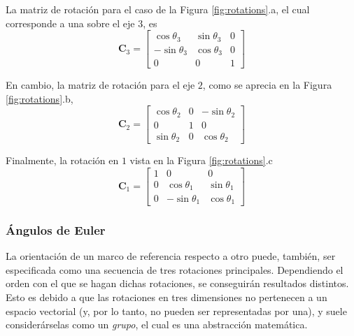 La matriz de rotación para el caso de la Figura \ref{fig:rotations}.a, el cual corresponde a una sobre el eje $3$, es
\begin{equation}
    \bm{C}_3 = 
    \begin{bmatrix}
        \cos \theta_3 & \sin \theta_3 & 0 \\
        -\sin \theta_3 & \cos \theta_3 & 0 \\
        0 & 0 & 1
    \end{bmatrix}
\end{equation}

En cambio, la matriz de rotación para el eje $2$, como se aprecia en la Figura \ref{fig:rotations}.b,
\begin{equation}
    \bm{C}_2 = 
    \begin{bmatrix}
        \cos \theta_2 & 0 & - \sin \theta_2 \\
        0 & 1 & 0 \\
        \sin \theta_2 & 0 & \cos \theta_2
    \end{bmatrix}
\end{equation}

Finalmente, la rotación en $1$ vista en la Figura \ref{fig:rotations}.c
\begin{equation}
    \bm{C}_1 = 
    \begin{bmatrix}
        1 & 0 & 0 \\
        0 & \cos \theta_1 & \sin \theta_1 \\
        0 & -\sin \theta_1 & \cos \theta_1
    \end{bmatrix}
\end{equation}



\subsubsection{Ángulos de Euler}
La orientación de un marco de referencia respecto a otro puede, también, ser especificada como una secuencia de tres rotaciones principales. Dependiendo el orden con el que se hagan dichas rotaciones, se conseguirán resultados distintos. Esto es debido a que las rotaciones en tres dimensiones no pertenecen a un espacio vectorial (y, por lo tanto, no pueden ser representadas por una), y suele considerárselas como un \textit{grupo}, el cual es una abstracción matemática. %

